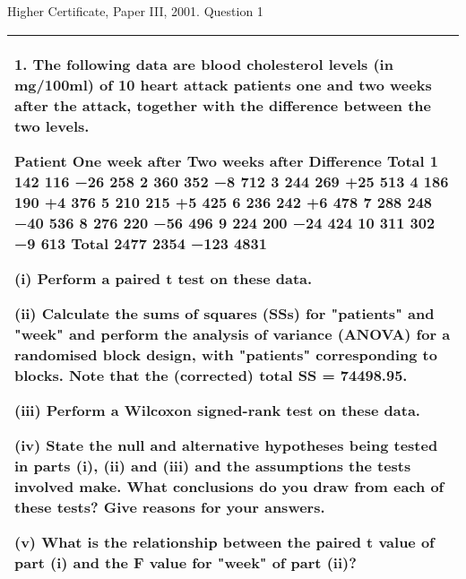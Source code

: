 \documentclass[a4paper,12pt]{article}
\begin{document}

Higher Certificate, Paper III, 2001. Question 1

\begin{table}[ht!]
     


\centering
     


\begin{tabular}{|p{15cm}|}
     


\hline 


1. The following data are blood cholesterol levels (in mg/100ml) of 10 heart attack patients one and two weeks after the attack, together with the difference between the two levels. 
 
Patient One week after Two weeks after 
Difference Total 
1   142   116   −26   258 
2   360   352     −8   712 
3   244   269   +25   513 
4   186   190     +4   376 
5   210   215     +5   425 
6   236   242     +6   478 
7   288   248   −40   536 
8   276   220   −56   496 
9   224   200   −24   424 
10   311   302     −9   613 
Total 2477 2354 −123 4831 
 
 
(i) Perform a paired t test on these data. 
 
 
(ii) Calculate the sums of squares (SSs) for "patients" and "week" and perform the analysis of variance (ANOVA) for a randomised block design, with "patients" corresponding to blocks.  Note that the (corrected) total SS = 74498.95.  
 
(iii) Perform a Wilcoxon signed-rank test on these data. 
 
 
(iv) State the null and alternative hypotheses being tested in parts (i), (ii) and (iii) and the assumptions the tests involved make.  What conclusions do you draw from each of these tests?  Give reasons for your answers.  
 
(v) What is the relationship between the paired t value of part (i) and the F value for "week" of part (ii)?  
 
 
\\ \hline



\end{tabular}
    


\end{table}
\end{document}
